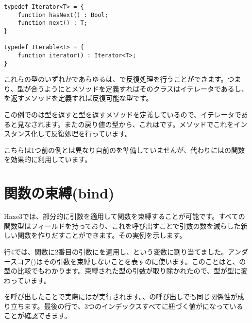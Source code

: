 \begin{lstlisting}
typedef Iterator<T> = {
	function hasNext() : Bool;
	function next() : T;
}

typedef Iterable<T> = {
	function iterator() : Iterator<T>;
}
\end{lstlisting}

これらの型のいずれかであらゆるは、で反復処理を行うことができます。つまり、型が合うようにとメソッドを定義すればそのクラスはイテレータであるし、を返すメソッドを定義すれば反復可能な型です。


この例でのは型を返すと型を返すメソッドを定義しているので、イテレータであると見なされます。またの戻り値の型から、これはです。メソッドでこれをインスタンス化して反復処理を行っています。


こちらは1つ前の例とは異なり自前のを準備していませんが、代わりにはの関数を効果的に利用しています。


\section{関数の束縛(bind)}
\label{lf-function-bindings}

Haxe3では、部分的に引数を適用して関数を束縛することが可能です。すべての関数型はフィールドを持っており、これを呼び出すことで引数の数を減らした新しい関数を作りだすことができます。その実例を示します。


行4では、関数に2番目の引数にを適用し、という変数に割り当てました。アンダースコア(\expr{_})はその引数を束縛しないことを表すのに使います。このことはと、の型の比較でもわかります。束縛された型の引数が取り除かれたので、型が型に変わっています。

を呼び出したことで実際にはが実行されます。、の呼び出しでも同じ関係性が成り立ちます。最後の行で、3つのインデックスすべてに紐づく値がになっていることが確認できます。

